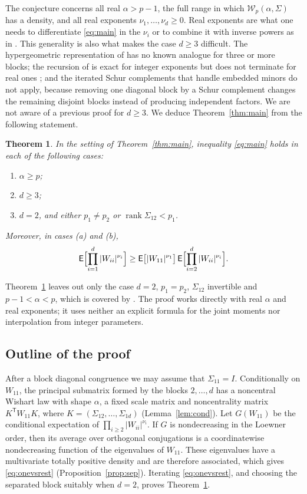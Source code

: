 \documentclass{amsart}
\newtheorem{theorem}{Theorem}[section]
\theoremstyle{definition}
\theoremstyle{remark}
\numberwithin{equation}{section}
\newcommand{\E}{\mathsf{E}}
\newcommand{\W}{\mathcal{W}}
\newcommand{\rank}{\operatorname{rank}}
\begin{document}
The conjecture concerns all real $\alpha>p-1$, the full range in which $\W_p(\alpha,\Sigma)$ has a density, and all real exponents $\nu_1,\dots,\nu_d\ge0$. Real exponents are what one needs to differentiate \eqref{eq:main} in the $\nu_i$ or to combine it with inverse powers as in \cite[Proposition~3.9]{GOR24a}. This generality is also what makes the case $d\ge3$ difficult. The hypergeometric representation of \cite{GOR25} has no known analogue for three or more blocks; the recursion of \cite{GO26} is exact for integer exponents but does not terminate for real ones \cite[Remark~3.2]{GO26}; and the iterated Schur complements that handle embedded minors \cite{GOR24b} do not apply, because removing one diagonal block by a Schur complement changes the remaining disjoint blocks instead of producing independent factors. We are not aware of a previous proof for $d\ge3$. We deduce Theorem~\ref{thm:main} from the following statement.

\begin{theorem}\label{thm:sep}
In the setting of Theorem~\ref{thm:main}, inequality \eqref{eq:main} holds in each of the following cases:
\begin{enumerate}
\item[(a)] $\alpha\ge p$;
\item[(b)] $d\ge3$;
\item[(c)] $d=2$, and either $p_1\ne p_2$ or $\rank\Sigma_{12}<p_1$.
\end{enumerate}
Moreover, in cases (a) and (b),
\begin{equation}\label{eq:onevsrest}
\E\Bigl[\prod_{i=1}^d|W_{ii}|^{\nu_i}\Bigr]\ge\E\bigl[|W_{11}|^{\nu_1}\bigr]\,\E\Bigl[\prod_{i=2}^d|W_{ii}|^{\nu_i}\Bigr].
\end{equation}
\end{theorem}

Theorem~\ref{thm:sep} leaves out only the case $d=2$, $p_1=p_2$, $\Sigma_{12}$ invertible and $p-1<\alpha<p$, which is covered by \cite[Corollary~3.4]{GOR25}. The proof works directly with real $\alpha$ and real exponents; it uses neither an explicit formula for the joint moments nor interpolation from integer parameters.

\subsection*{Outline of the proof}
After a block diagonal congruence we may assume that $\Sigma_{11}=I$. Conditionally on $W_{11}$, the principal submatrix formed by the blocks $2,\dots,d$ has a noncentral Wishart law with shape $\alpha$, a fixed scale matrix and noncentrality matrix $K^{\mathsf T}W_{11}K$, where $K=(\Sigma_{12},\dots,\Sigma_{1d})$ (Lemma~\ref{lem:cond}). Let $G(W_{11})$ be the conditional expectation of $\prod_{i\ge2}|W_{ii}|^{\nu_i}$. If $G$ is nondecreasing in the Loewner order, then its average over orthogonal conjugations is a coordinatewise nondecreasing function of the eigenvalues of $W_{11}$. These eigenvalues have a multivariate totally positive density and are therefore associated, which gives \eqref{eq:onevsrest} (Proposition~\ref{prop:sep}). Iterating \eqref{eq:onevsrest}, and choosing the separated block suitably when $d=2$, proves Theorem~\ref{thm:sep}.
\end{document}
